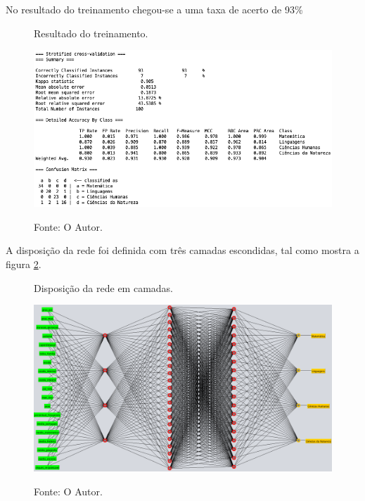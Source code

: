 No resultado do treinamento chegou-se a uma taxa de acerto de 93\%

\begin{figure}[H]
	\caption{Resultado do treinamento.}
	\centering %
	\includegraphics[width=16cm]{resources/resultado_treinamento.png} %
	\label{figura:rede}
	\captionsetup{singlelinecheck = false, format= hang, justification=raggedright, labelsep=space, width=16cm}
	\caption*{\footnotesize Fonte: O Autor.}
\end{figure}

A disposição da rede foi definida com três camadas escondidas, tal como mostra a figura \ref{figura:rede}.

\begin{figure}[H]
	\caption{Disposição da rede em camadas.}
	\centering %
	\includegraphics[width=16cm]{resources/rede.png} %
	\label{figura:rede}
	\captionsetup{singlelinecheck = false, format= hang, justification=raggedright, labelsep=space, width=16cm}
	\caption*{\footnotesize Fonte: O Autor.}
\end{figure}

